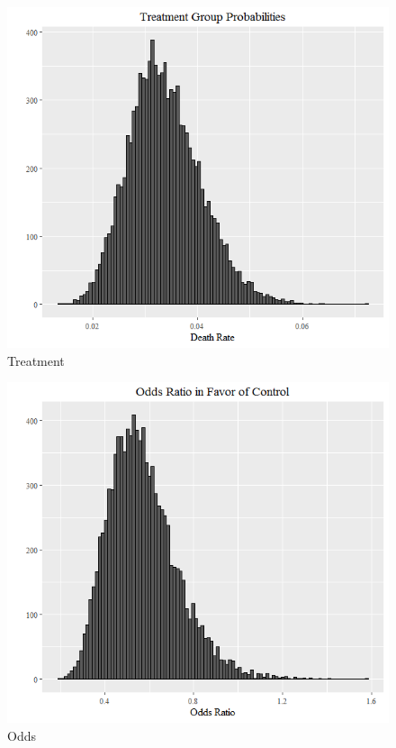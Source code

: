 \documentclass{article}
\begin{document}
\begin{figure}[!ht]
  \caption{Treatment}
  \centering
    \includegraphics[width=\textwidth]{Problem34--Treatment}
\end{figure}

\begin{figure}[!ht]
  \caption{Odds}
  \centering
    \includegraphics[width=\textwidth]{Problem34--Odds}
\end{figure}
\end{document}
